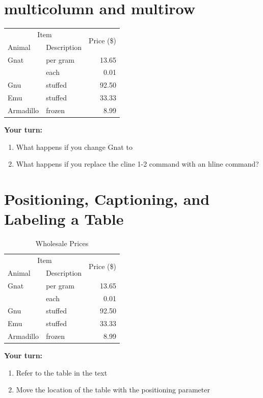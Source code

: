 \documentclass{article}
\begin{document}
 \section{multicolumn  and multirow}


\begin{tabular}{|l|l|r|} \hline
  \multicolumn{2}{|c|}{Item} & \multirow{2}{*}{Price (\$)}\\ \cline{1-2}
  Animal & Description &  \\ \hline
  Gnat  & per gram & 13.65 \\
        & each     &  0.01 \\
  Gnu   & stuffed  & 92.50 \\
  Emu   & stuffed  & 33.33 \\
  Armadillo & frozen & 8.99 \\ \hline
 \end{tabular}
  
 \bigskip
  
{\bf Your turn:} 
\begin{enumerate}
\item What happens if you change Gnat to %
\item What happens if you replace the cline 1-2 command with an hline command?  
\end{enumerate}
\clearpage
 \section{Positioning, Captioning, and Labeling a Table}

\begin{table}[b]
\centering
\begin{tabular}{|l|l|r|} \hline
  \multicolumn{2}{|c|}{Item} & \multirow{2}{*}{Price (\$)}\\ \cline{1-2}
  Animal & Description &  \\ \hline
  Gnat  & per gram & 13.65 \\
        & each     &  0.01 \\
  Gnu   & stuffed  & 92.50 \\
  Emu   & stuffed  & 33.33 \\
  Armadillo & frozen & 8.99 \\ \hline
 \end{tabular}
 \caption{\label{tab:prices}Wholesale Prices}
 \end{table}
  
 \bigskip
  
{\bf Your turn:} 
\begin{enumerate}
\item Refer to the table in the text
\item Move the location of the table with the positioning parameter
\end{enumerate}
\clearpage
\end{document}
